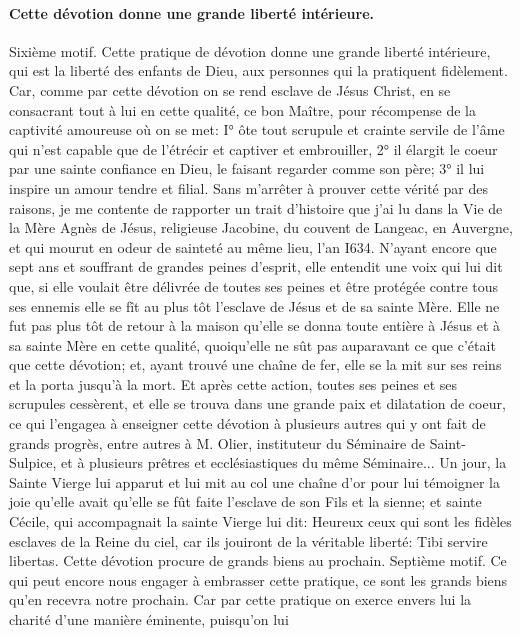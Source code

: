 \paragraph{Cette dévotion donne une grande liberté intérieure.}
 Sixième motif. Cette pratique de dévotion donne une grande liberté intérieure, qui est la liberté des enfants
de Dieu, aux personnes qui la pratiquent fidèlement. Car, comme par cette dévotion on se rend esclave de Jésus Christ, en se consacrant tout à lui en cette qualité, ce bon Maître, pour récompense de la captivité amoureuse où
on se met: I° ôte tout scrupule et crainte servile de l'âme qui n'est capable que de l'étrécir et captiver et
embrouiller, 2° il élargit le coeur par une sainte confiance en Dieu, le faisant regarder comme son père; 3° il lui
inspire un amour tendre et filial.
 Sans m'arrêter à prouver cette vérité par des raisons, je me contente de rapporter un trait d'histoire que j'ai lu
dans la Vie de la Mère Agnès de Jésus, religieuse Jacobine, du couvent de Langeac, en Auvergne, et qui mourut
en odeur de sainteté au même lieu, l'an I634. N'ayant encore que sept ans et souffrant de grandes peines d'esprit,
elle entendit une voix qui lui dit que, si elle voulait être délivrée de toutes ses peines et être protégée contre tous
ses ennemis elle se fît au plus tôt l'esclave de Jésus et de sa sainte Mère. Elle ne fut pas plus tôt de retour à la
maison qu'elle se donna toute entière à Jésus et à sa sainte Mère en cette qualité, quoiqu'elle ne sût pas
auparavant ce que c'était que cette dévotion; et, ayant trouvé une chaîne de fer, elle se la mit sur ses reins et la
porta jusqu'à la mort. Et après cette action, toutes ses peines et ses scrupules cessèrent, et elle se trouva dans
une grande paix et dilatation de coeur, ce qui l'engagea à enseigner cette dévotion à plusieurs autres qui y ont fait
de grands progrès, entre autres à M. Olier, instituteur du Séminaire de Saint-Sulpice, et à plusieurs prêtres et
ecclésiastiques du même Séminaire... Un jour, la Sainte Vierge lui apparut et lui mit au col une chaîne d'or pour lui
témoigner la joie qu'elle avait qu'elle se fût faite l'esclave de son Fils et la sienne; et sainte Cécile, qui
accompagnait la sainte Vierge lui dit: Heureux ceux qui sont les fidèles esclaves de la Reine du ciel, car ils jouiront
de la véritable liberté: Tibi servire libertas.
Cette dévotion procure de grands biens au prochain.
 Septième motif. Ce qui peut encore nous engager à embrasser cette pratique, ce sont les grands biens qu'en
recevra notre prochain. Car par cette pratique on exerce envers lui la charité d'une manière éminente, puisqu'on lui
